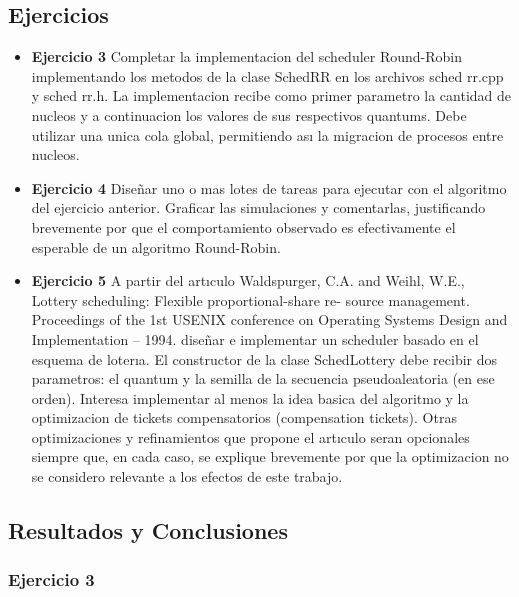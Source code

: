 
\subsection{Ejercicios}
\begin{itemize}
 \item 
\textbf{Ejercicio 3}  Completar la implementacion del scheduler Round-Robin implementando los
metodos de la clase SchedRR en los archivos sched rr.cpp y sched rr.h. La implementacion
recibe como primer parametro la cantidad de nucleos y a continuacion los valores de sus
respectivos quantums. Debe utilizar una unica cola global, permitiendo ası la migracion de
procesos entre nucleos.
\item \textbf{Ejercicio 4} Diseñar uno o mas lotes de tareas para ejecutar con el algoritmo del ejercicio
anterior. Graficar las simulaciones y comentarlas, justificando brevemente por que el comportamiento 
observado es efectivamente el esperable de un algoritmo Round-Robin.
\item \textbf{Ejercicio 5} A partir del artıculo
Waldspurger, C.A. and Weihl, W.E., Lottery scheduling: Flexible proportional-share re-
source management. Proceedings of the 1st USENIX conference on Operating Systems
Design and Implementation – 1994.
diseñar e implementar un scheduler basado en el esquema de loterıa. El constructor de la
clase SchedLottery debe recibir dos parametros: el quantum y la semilla de la secuencia
pseudoaleatoria (en ese orden). Interesa implementar al menos la idea basica del algoritmo
y la optimizacion de tickets compensatorios (compensation tickets). Otras optimizaciones y
refinamientos que propone el artıculo seran opcionales siempre que, en cada caso, se explique
brevemente por que la optimizacion no se considero relevante a los efectos de este trabajo.

\end{itemize}


\subsection{Resultados y Conclusiones}

\subsubsection[Resolución Ejercicio 3]{Ejercicio 3}

